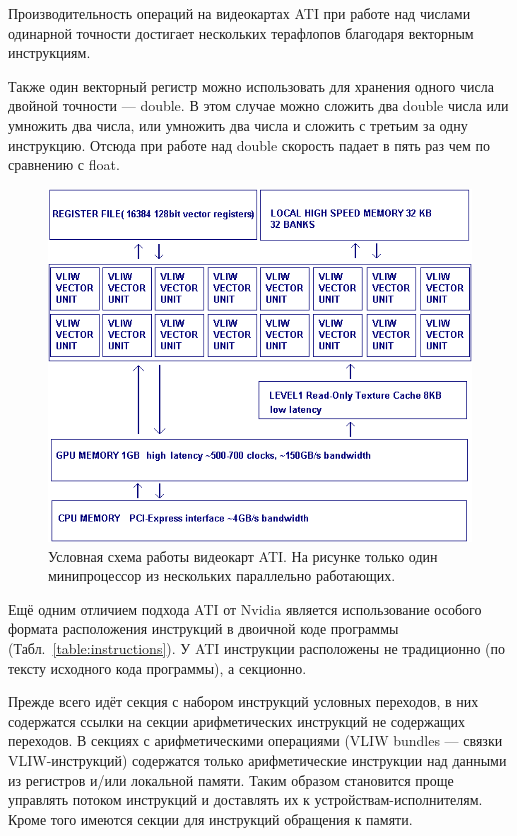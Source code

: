 Производительность операций на видеокартах ATI при работе над числами одинарной точности достигает нескольких терафлопов благодаря векторным инструкциям.

Также один векторный регистр можно использовать для хранения одного числа двойной точности --- double. В этом случае можно сложить два double числа или умножить два числа, или умножить два числа и сложить с третьим за одну инструкцию. Отсюда при работе над double скорость падает в пять раз чем по сравнению с float. 

\begin{figure}[ht!]
\begin{center}
\includegraphics[width=0.8\linewidth]{img/radeon1.png}
\caption{Условная схема работы видеокарт ATI. На рисунке только один минипроцессор из нескольких параллельно работающих.}
\label{ris:ati}
\end{center}
\end{figure}

Ещё одним отличием подхода ATI от Nvidia является использование особого формата расположения инструкций в двоичной коде программы (Табл.~\ref{table:instructions}). У ATI инструкции расположены не традиционно (по тексту исходного кода программы), а секционно.

Прежде всего идёт секция с набором инструкций условных переходов, в них содержатся ссылки на секции арифметических инструкций не содержащих переходов. В секциях с арифметическими операциями (VLIW bundles --- связки VLIW-инструкций) содержатся только арифметические инструкции над данными из регистров и/или локальной памяти. Таким образом становится проще управлять потоком инструкций и доставлять их к устройствам-исполнителям. Кроме того имеются секции для инструкций обращения к памяти.

